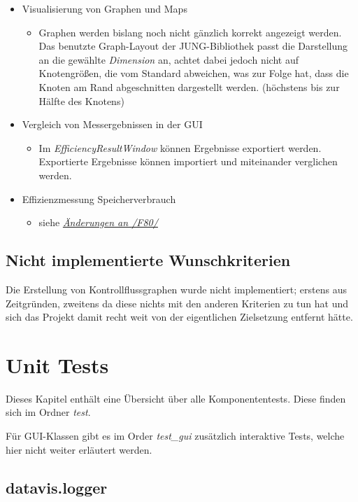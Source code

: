 \documentclass[a4paper]{report}
\begin{document}
\begin{itemize}
	\item Visualisierung von Graphen und Maps
	\begin{itemize}
		\item Graphen werden bislang noch nicht gänzlich korrekt angezeigt werden. Das benutzte Graph-Layout der JUNG-Bibliothek passt die Darstellung an die gewählte \emph{Dimension} an, achtet dabei jedoch nicht auf Knotengrößen, die vom Standard abweichen, was zur Folge hat, dass die Knoten am Rand abgeschnitten dargestellt werden. (höchstens bis zur Hälfte des Knotens)
	\end{itemize}
	\item Vergleich von Messergebnissen in der GUI
	\begin{itemize}
		\item Im \emph{EfficiencyResultWindow} können Ergebnisse exportiert werden. Exportierte Ergebnisse können importiert und miteinander verglichen werden.
	\end{itemize}
	\item Effizienzmessung Speicherverbrauch
	\begin{itemize}
		\item siehe \hyperref[F80]{\emph{Änderungen an \emph{/F80/}}}
	\end{itemize}
\end{itemize}

\section{Nicht implementierte Wunschkriterien}

Die Erstellung von Kontrollflussgraphen wurde nicht implementiert; erstens aus Zeitgründen, zweitens da diese nichts mit den anderen Kriterien zu tun hat und sich das Projekt damit recht weit von der eigentlichen Zielsetzung entfernt hätte.

\chapter{Unit Tests}

Dieses Kapitel enthält eine Übersicht über alle Komponententests. Diese finden sich im Ordner \emph{test}.

Für GUI-Klassen gibt es im Order \emph{test\_gui} zusätzlich interaktive Tests, welche hier nicht weiter erläutert werden.

\section{datavis.logger}
\end{document}
